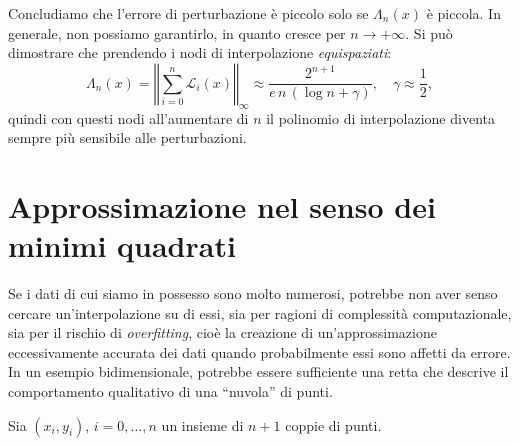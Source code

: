 Concludiamo che l'errore di perturbazione è piccolo solo se $\Lambda_{n}(x)$ è piccola. In generale, non possiamo garantirlo, in quanto cresce per $n\rightarrow +\infty $. Si può dimostrare che prendendo i nodi di interpolazione \textit{equispaziati}:
\begin{equation*}
\Lambda _{n}(x) =\left\Vert \sum ^{n}_{i=0}\mathcal{L}_{i}(x)\right\Vert _{\infty } \approx \frac{2^{n+1}}{e\, n\, (\log n+\gamma )} ,\quad\gamma \approx \frac{1}{2} ,
\end{equation*}
quindi con questi nodi all'aumentare di $n$ il polinomio di interpolazione diventa sempre più sensibile alle perturbazioni.

\section{Approssimazione nel senso dei minimi quadrati}
Se i dati di cui siamo in possesso sono molto numerosi, potrebbe non aver senso cercare un'interpolazione su di essi, sia per ragioni di complessità computazionale, sia per il rischio di \textit{overfitting}, cioè la creazione di un'approssimazione eccessivamente accurata dei dati quando probabilmente essi sono affetti da errore.
In un esempio bidimensionale, potrebbe essere sufficiente una retta che descrive il comportamento qualitativo di una ``nuvola'' di punti.

Sia $( x_{i} ,y_{i})$, $i=0,\dotsc ,n$ un insieme di $n+1$ coppie di punti.


